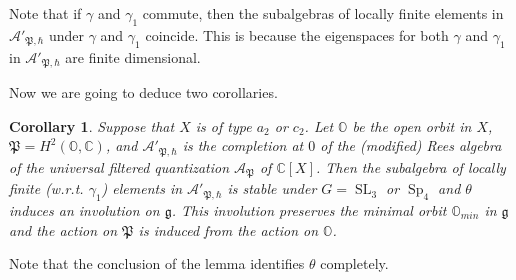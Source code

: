 \documentclass[12pt]{amsart}
\newcommand{\C}{\mathbb{C}}
\newcommand{\A}{\mathcal{A}}
\newcommand{\g}{\mathfrak{g}}
\newcommand{\Orb}{\mathbb{O}}
\newcommand{\param}{\mathfrak{P}}
\newtheorem{Cor}[Thm]{Corollary}
\theoremstyle{definition}
\numberwithin{equation}{section}
\begin{document}
Note that if $\gamma$ and $\gamma_1$ commute, then the subalgebras of locally finite elements in
$\A'_{\param,\hbar}$ under $\gamma$ and $\gamma_1$ coincide. This is because the eigenspaces for
both $\gamma$ and $\gamma_1$ in $\A'_{\param,\hbar}$ are finite dimensional.

Now we are going to deduce two corollaries.

\begin{Cor}\label{Cor:a2_c2_involution}
Suppose that $X$ is of type $a_2$ or $c_2$.
Let $\Orb$ be the open orbit in $X$,
$\param=H^2(\Orb,\C)$, and $\A'_{\param,\hbar}$ is the completion at $0$
of the (modified) Rees algebra of the universal filtered quantization $\A_{\param}$ of $\C[X]$.
Then the subalgebra of locally
finite (w.r.t. $\gamma_1$) elements in $\A'_{\param,\hbar}$ is stable under $G=\operatorname{SL}_3$
or $\operatorname{Sp}_4$ and $\theta$ induces an involution on $\g$. This involution preserves
the minimal orbit $\Orb_{min}$ in $\g$
and the action on $\param$ is induced from the action on $\Orb$.
\end{Cor}
Note that the conclusion of the lemma identifies $\theta$ completely.
\end{document}
